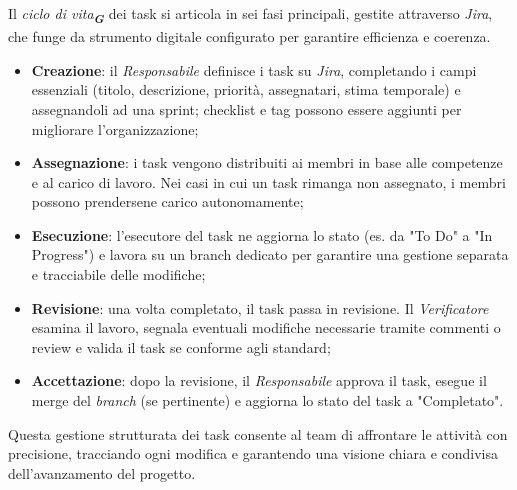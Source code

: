 Il \emph{ciclo di vita}\textsubscript{\textit{\textbf{G}}} dei task si articola in sei fasi principali, gestite attraverso \emph{Jira}, che funge da strumento digitale configurato per garantire efficienza e coerenza.
\begin{itemize}
    \item \textbf{Creazione}: il \emph{Responsabile} definisce i task su \emph{Jira}, completando i campi essenziali (titolo, descrizione, priorità, assegnatari, stima temporale) e assegnandoli ad una sprint; checklist e tag possono essere aggiunti per migliorare l’organizzazione;
    \item \textbf{Assegnazione}: i task vengono distribuiti ai membri in base alle competenze e al carico di lavoro. Nei casi in cui un task rimanga non assegnato, i membri possono prendersene carico autonomamente;
    \item \textbf{Esecuzione}: l’esecutore del task ne aggiorna lo stato (es. da "To Do" a "In Progress") e lavora su un branch dedicato per garantire una gestione separata e tracciabile delle modifiche;
    \item \textbf{Revisione}: una volta completato, il task passa in revisione. Il \emph{Verificatore} esamina il lavoro, segnala eventuali modifiche necessarie tramite commenti o review e valida il task se conforme agli standard;
    \item \textbf{Accettazione}: dopo la revisione, il \emph{Responsabile} approva il task, esegue il merge del \emph{branch} (se pertinente) e aggiorna lo stato del task a "Completato".
\end{itemize}    
Questa gestione strutturata dei task consente al team di affrontare le attività con precisione, tracciando ogni modifica e garantendo una visione chiara e condivisa dell’avanzamento del progetto.

